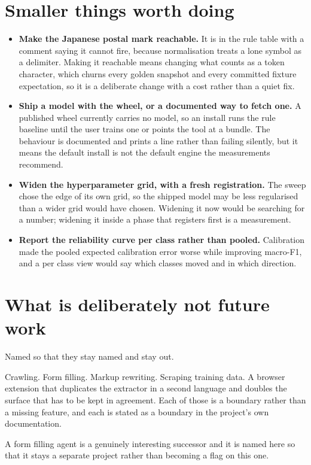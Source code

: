 \section{Smaller things worth doing}

\begin{itemize}
  \item \textbf{Make the Japanese postal mark reachable.} It is in the rule table
    with a comment saying it cannot fire, because normalisation treats a lone
    symbol as a delimiter. Making it reachable means changing what counts as a
    token character, which churns every golden snapshot and every committed
    fixture expectation, so it is a deliberate change with a cost rather than a
    quiet fix.
  \item \textbf{Ship a model with the wheel, or a documented way to fetch one.}
    A published wheel currently carries no model, so an install runs the rule
    baseline until the user trains one or points the tool at a bundle. The
    behaviour is documented and prints a line rather than failing silently, but
    it means the default install is not the default engine the measurements
    recommend.
  \item \textbf{Widen the hyperparameter grid, with a fresh registration.} The
    sweep chose the edge of its own grid, so the shipped model may be less
    regularised than a wider grid would have chosen. Widening it now would be
    searching for a number; widening it inside a phase that registers first is a
    measurement.
  \item \textbf{Report the reliability curve per class rather than pooled.}
    Calibration made the pooled expected calibration error worse while improving
    macro-F1, and a per class view would say which classes moved and in which
    direction.
\end{itemize}

\section{What is deliberately not future work}

Named so that they stay named and stay out.

Crawling. Form filling. Markup rewriting. Scraping training data. A browser
extension that duplicates the extractor in a second language and doubles the
surface that has to be kept in agreement. Each of those is a boundary rather than
a missing feature, and each is stated as a boundary in the project's own
documentation.

A form filling agent is a genuinely interesting successor and it is named here so
that it stays a separate project rather than becoming a flag on this one.
